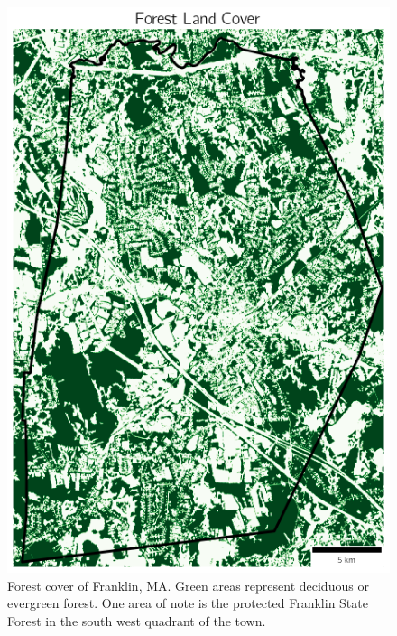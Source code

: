 \documentclass[12pt, stu, floatsintext,table]{apa7}
\begin{document}
\begin{figure}[H]
    \centering
    \includegraphics[width=0.75\linewidth]{figures/forest_cover.png}
    \caption{Forest cover of Franklin, MA. Green areas represent deciduous or evergreen forest. One area of note is the protected Franklin State Forest in the south west quadrant of the town. }
\end{figure}
\end{document}
